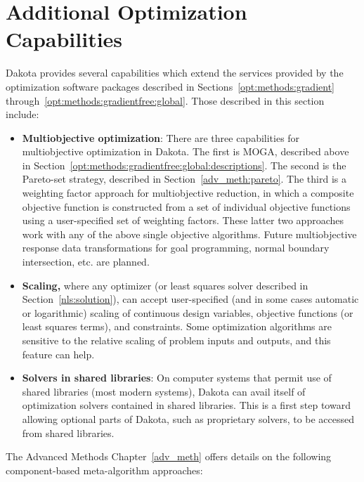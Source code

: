 \section{Additional Optimization Capabilities}
\label{opt:additional}

Dakota provides several capabilities which extend the services
provided by the optimization software packages described in
Sections~\ref{opt:methods:gradient}
through~\ref{opt:methods:gradientfree:global}. Those described in this
section include:
\begin{itemize}
\item {\bf Multiobjective optimization}: There are three capabilities
  for multiobjective optimization in Dakota. The first is MOGA,
  described above in
  Section~\ref{opt:methods:gradientfree:global:descriptions}. The
  second is the Pareto-set strategy, described in
  Section~\ref{adv_meth:pareto}. The third is a weighting factor approach for
  multiobjective reduction, in which a composite objective function is
  constructed from a set of individual objective functions using a
  user-specified set of weighting factors. These latter two approaches
  work with any of the above single objective algorithms. Future
  multiobjective response data transformations for goal programming,
  normal boundary intersection, etc. are planned.
\item {\bf Scaling,} where any optimizer (or least squares solver
  described in Section~\ref{nls:solution}), can accept user-specified
  (and in some cases automatic or logarithmic) scaling of continuous
  design variables, objective functions (or least squares terms), and
  constraints. Some optimization algorithms are sensitive to the
  relative scaling of problem inputs and outputs, and this feature can
  help.
\item {\bf Solvers in shared libraries}: On computer systems that
  permit use of shared libraries (most modern systems), Dakota can
  avail itself of optimization solvers contained in shared libraries.
  This is a first step toward allowing optional parts of Dakota, such
  as proprietary solvers, to be accessed from shared
  libraries.\end{itemize}
The Advanced Methods Chapter~\ref{adv_meth} offers details on the 
following component-based meta-algorithm approaches:
